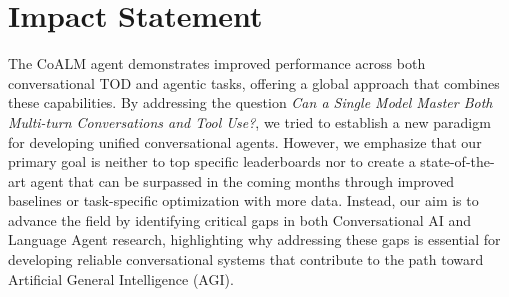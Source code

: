 \section{Impact Statement}
The CoALM agent demonstrates improved performance across both conversational TOD and agentic tasks, offering a global approach that combines these capabilities. By addressing the question \textit{Can a Single Model Master Both Multi-turn Conversations and Tool Use?}, we tried to establish a new paradigm for developing unified conversational agents. However, we emphasize that our primary goal is neither to top specific leaderboards nor to create a state-of-the-art agent that can be surpassed in the coming months through improved baselines or task-specific optimization with more data. Instead, our aim is to advance the field by identifying critical gaps in both Conversational AI and Language Agent research, highlighting why addressing these gaps is essential for developing reliable conversational systems that contribute to the path toward Artificial General Intelligence (AGI).


